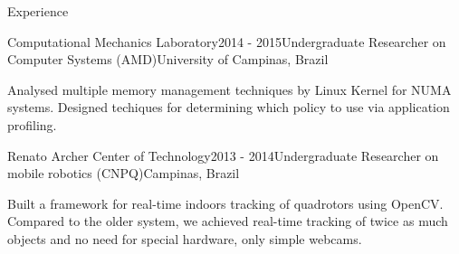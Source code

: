 \documentclass[8pt]{resume} %
\newcommand{\tit}[1]{\textit{#1}}
\begin{document}
\begin{rSection}{Experience}
\begin{rSubsection}{Computational Mechanics Laboratory}{2014 - 2015}{Undergraduate Researcher on Computer Systems (AMD)}{University of Campinas, Brazil}
    \item Analysed multiple memory management techniques by Linux Kernel
        for NUMA systems. Designed techiques for determining which policy
        to use via application profiling.
\end{rSubsection}

\begin{rSubsection}{Renato Archer Center of Technology}{2013 - 2014}{Undergraduate Researcher on mobile robotics (CNPQ)}{Campinas, Brazil}
    \item Built a framework for real-time indoors tracking of
        quadrotors using OpenCV. Compared to the older system,
        we achieved real-time tracking of twice as much objects
        and no need for special hardware, only simple webcams.
\end{rSubsection}


\end{rSection}

\end{document}
